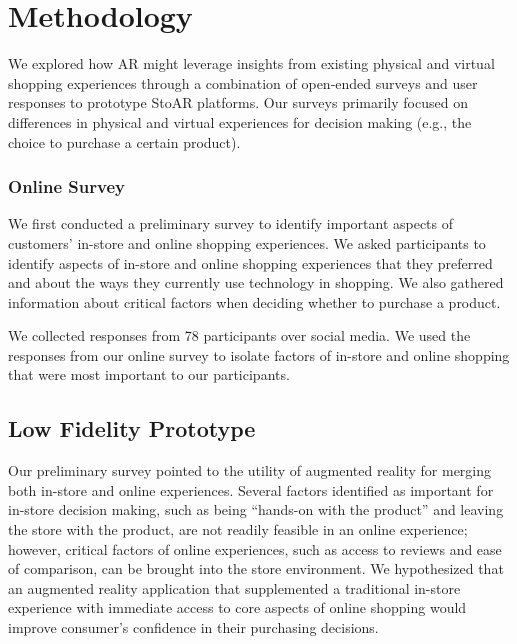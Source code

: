 \section{Methodology}

We explored how AR might leverage insights from existing physical and virtual shopping experiences through a combination of open-ended surveys and user responses to prototype StoAR platforms. Our surveys primarily focused on differences in physical and virtual experiences for decision making (e.g., the choice to purchase a certain product). 

\subsubsection{Online Survey}
We first conducted a preliminary survey to identify important aspects of customers' in-store and online shopping experiences. We asked participants
to identify aspects of in-store and online shopping experiences that they preferred and about the ways they currently use technology in shopping.   We also gathered information about critical factors when deciding whether to purchase a product.  

We collected responses from 78 participants over social media. We used the responses from our online survey to isolate factors of in-store and online shopping that were most important to our participants.   

\subsection{Low Fidelity Prototype}
Our preliminary survey pointed to the utility of augmented reality for merging both in-store and online experiences. Several factors identified as important for in-store decision making, such as being ``hands-on with the product'' and leaving the store with the product, are not readily feasible in an online experience; however, critical factors of online experiences, such as access to reviews and ease of comparison, can be brought into the store environment. We hypothesized that an augmented reality application that supplemented a traditional in-store experience with immediate access to core aspects of online shopping would improve consumer's confidence in their purchasing decisions. 

